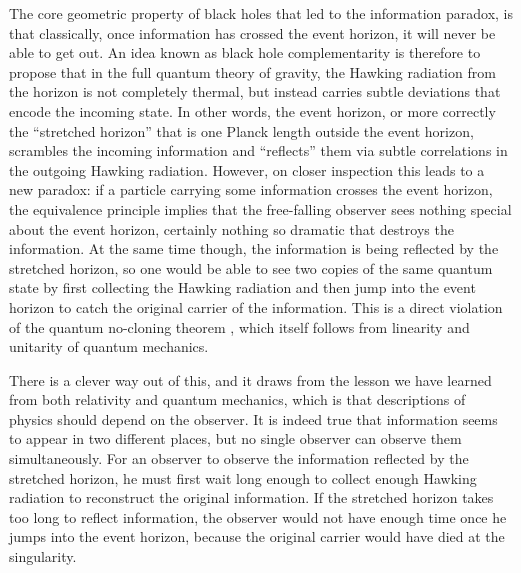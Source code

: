 \documentclass{brownthesis}
\begin{document}
The core geometric property of black holes that led to the information paradox,
is that classically, once information has crossed the event horizon, it will never be
able to get out. An idea known as black hole complementarity \cite{PhysRevD.48.3743}
is therefore to propose that in the full quantum theory of gravity,
the Hawking radiation from the horizon is not completely thermal,
but instead carries subtle deviations that encode the incoming state. In other words, the
event horizon, or more correctly the ``stretched horizon'' that is one Planck length outside
the event horizon, scrambles the incoming information and ``reflects'' them via subtle
correlations in the outgoing Hawking radiation. However, on closer inspection this leads
to a new paradox: if a particle carrying some information crosses the event horizon,
the equivalence principle implies that the free-falling observer sees nothing special
about the event horizon, certainly nothing so dramatic that destroys the information.
At the same time though, the information is being reflected by the stretched horizon,
so one would be able to see two copies of the same quantum state by first collecting
the Hawking radiation and then jump into the event horizon to catch the original
carrier of the information. This is a direct violation
of the quantum no-cloning theorem \cite{nielsen2001quantum}, which itself follows from
linearity and unitarity of quantum mechanics.

There is a clever way out of this, and it draws from the lesson we
have learned from both relativity and quantum mechanics, which is that descriptions
of physics should depend on the observer. It is indeed true that information seems to
appear in two different places, but no single observer can observe them simultaneously.
For an observer to observe the information reflected by the stretched horizon, he
must first wait long enough to collect enough Hawking radiation to reconstruct the original
information. If the stretched horizon takes too long to reflect information, the observer
would not have enough time once he jumps into the event horizon, because the original
carrier would have died at the singularity.
\end{document}
